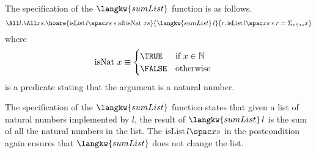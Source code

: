 The specification of the $\langkw{sumList}$ function is as follows.
\begin{align*}
\All l. \All xs.
  \hoare{ \isList {l} {xs} \ast \operatorname{all} \operatorname{isNat}\, xs}{\langkw{sumList} \, l}{r.  \isList {l} {xs} \ast r = \Sigma_{x \in xs} x}
\end{align*}
where 
\begin{align*}
\operatorname{isNat} \, x &\equiv \begin{cases} \TRUE & \text{if } x \in \mathbb{N} \\
																			\FALSE & \text{otherwise } \end{cases}
\end{align*}
is a predicate stating that the argument is a natural number.

The specification of the $\langkw{sumList}$ function states that given a list of natural numbers implemented by $l$, the result of $\langkw{sumList}\,l$ is the sum of all the natural numbers in the list.
The $\isList {l} {xs}$ in the postcondition again ensures that $\langkw{sumList}$ does not change the list.

